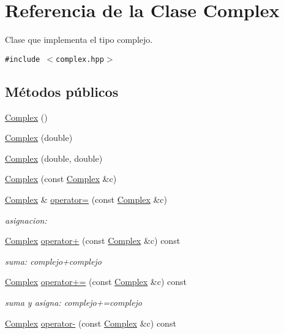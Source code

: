 \hypertarget{classComplex}{
\section{Referencia de la Clase Complex}
\label{classComplex}
}
Clase que implementa el tipo complejo.  


{\tt \#include $<$complex.hpp$>$}

\subsection*{Métodos públicos}
\begin{CompactItemize}
\item 
\hyperlink{classComplex_43b9f07cdf697c71b5fd506a6cc80b8f}{Complex} ()
\item 
\hyperlink{classComplex_d79a5d8db5595f6661f066e3a691ac40}{Complex} (double)
\item 
\hyperlink{classComplex_0a9ac766ecb69aa823210728b5238164}{Complex} (double, double)
\item 
\hyperlink{classComplex_d6b6aba985d85982e621b244c5533ce6}{Complex} (const \hyperlink{classComplex}{Complex} \&c)
\item 
\hyperlink{classComplex}{Complex} \& \hyperlink{classComplex_d63f572bf5b643c714e388cda5c6f5cb}{operator=} (const \hyperlink{classComplex}{Complex} \&c)
\begin{CompactList}\small\item\em asignacion: \item\end{CompactList}\item 
\hyperlink{classComplex}{Complex} \hyperlink{classComplex_85335af4619e9e47aa9c0846d1d149b0}{operator+} (const \hyperlink{classComplex}{Complex} \&c) const 
\begin{CompactList}\small\item\em suma: complejo+complejo \item\end{CompactList}\item 
\hyperlink{classComplex}{Complex} \hyperlink{classComplex_f4fd1eb88e00915f3f3d51d1d3eeeb0b}{operator+=} (const \hyperlink{classComplex}{Complex} \&c) const 
\begin{CompactList}\small\item\em suma y asigna: complejo+=complejo \item\end{CompactList}\item 
\hyperlink{classComplex}{Complex} \hyperlink{classComplex_9db6e1faaf7164c809d3567085b5c89f}{operator-} (const \hyperlink{classComplex}{Complex} \&c) const 

\end{CompactItemize}

